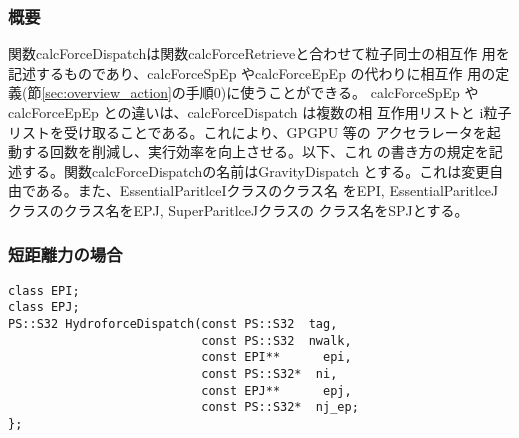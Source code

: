 
\subsubsection{概要}

関数calcForceDispatchは関数calcForceRetrieveと合わせて粒子同士の相互作
用を記述するものであり、calcForceSpEp やcalcForceEpEp の代わりに相互作
用の定義(節\ref{sec:overview_action}の手順0)に使うことができる。
calcForceSpEp やcalcForceEpEp との違いは、calcForceDispatch は複数の相
互作用リストと i粒子リストを受け取ることである。これにより、GPGPU 等の
アクセラレータを起動する回数を削減し、実行効率を向上させる。以下、これ
の書き方の規定を記述する。関数calcForceDispatchの名前はGravityDispatch
とする。これは変更自由である。また、EssentialParitlceIクラスのクラス名
をEPI, EssentialParitlceJクラスのクラス名をEPJ, SuperParitlceJクラスの
クラス名をSPJとする。

\subsubsection{短距離力の場合}

\begin{lstlisting}[caption=calcForceDispatch]
class EPI;
class EPJ;
PS::S32 HydroforceDispatch(const PS::S32  tag,
                           const PS::S32  nwalk,
                           const EPI**      epi,
                           const PS::S32*  ni,
                           const EPJ**      epj,
                           const PS::S32*  nj_ep;
};
\end{lstlisting}

